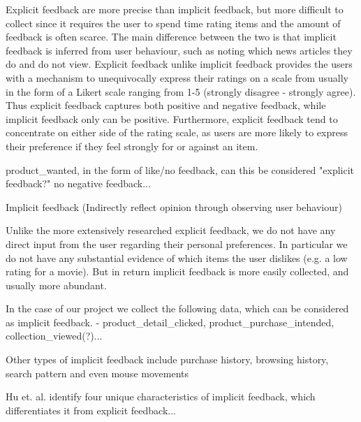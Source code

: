 Explicit feedback are more precise than implicit feedback, but more difficult to collect since it requires the user to spend time rating items and the amount of feedback is often scarce. The main difference between the two is that implicit feedback is inferred from user behaviour, such as noting which news articles they do and do not view. Explicit feedback unlike implicit feedback provides the users with a mechanism to unequivocally express their ratings on a scale from usually in the form of a Likert scale ranging from 1-5 (strongly disagree - strongly agree). Thus explicit feedback captures both positive and negative feedback, while implicit feedback only can be positive. Furthermore, explicit feedback tend to concentrate on either side of the rating scale, as users are more likely to express their preference if they feel strongly for or against an item.

product_wanted, in the form of like/no feedback, can this be considered "explicit feedback?" no negative feedback...

Implicit feedback (Indirectly reflect opinion through observing user behaviour)

Unlike the more extensively researched explicit feedback, we do not have any
direct input from the user regarding their personal preferences. In particular
we do not have any substantial evidence of which items the user dislikes (e.g. a
low rating for a movie). But in return implicit feedback is more easily
collected, and usually more abundant.

In the case of our project we collect the following data, which can be considered as implicit feedback.
- product_detail_clicked, product_purchase_intended, collection_viewed(?)...

Other types of implicit feedback include purchase history, browsing
history, search pattern and even mouse movements

Hu et. al. \cite{Hu2008} identify four unique characteristics of implicit feedback, which differentiates it from explicit feedback...

